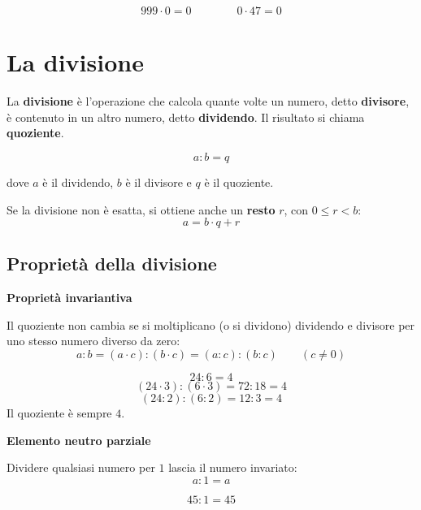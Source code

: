 \begin{esempio}
  \[
    999 \cdot 0 = 0 \qquad \qquad 0 \cdot 47 = 0
  \]
\end{esempio}

\section{La divisione}

\begin{definizione}
  La \textbf{divisione} è l'operazione che calcola quante volte un numero, detto \textbf{divisore}, è contenuto in un altro numero, detto \textbf{dividendo}. Il risultato si chiama \textbf{quoziente}.

  \[
    a : b = q
  \]

  dove $a$ è il dividendo, $b$ è il divisore e $q$ è il quoziente.

  \medskip
  Se la divisione non è esatta, si ottiene anche un \textbf{resto} $r$, con $0 \leq r < b$:
  \[
    a = b \cdot q + r
  \]
\end{definizione}

\subsection{Proprietà della divisione}

\begin{regola}
  \textbf{Proprietà invariantiva}

  Il quoziente non cambia se si moltiplicano (o si dividono) dividendo e divisore per uno stesso numero diverso da zero:
  \[
    a : b = (a \cdot c) : (b \cdot c) = (a : c) : (b : c) \qquad (c \neq 0)
  \]
\end{regola}

\begin{esempio}
  \[
    24 : 6 = 4
  \]
  \[
    (24 \cdot 3) : (6 \cdot 3) = 72 : 18 = 4
  \]
  \[
    (24 : 2) : (6 : 2) = 12 : 3 = 4
  \]
  Il quoziente è sempre $4$.
\end{esempio}

\begin{regola}
  \textbf{Elemento neutro parziale}

  Dividere qualsiasi numero per $1$ lascia il numero invariato:
  \[
    a : 1 = a
  \]
\end{regola}

\begin{esempio}
  \[
    45 : 1 = 45
  \]
\end{esempio}

